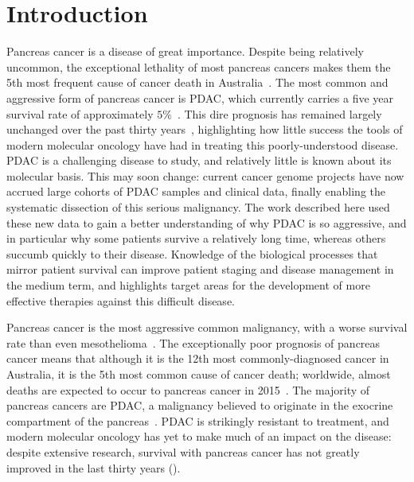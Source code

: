 \documentclass[thesis.tex]{subfiles}
\begin{document}
\chapter[Introduction]{Introduction}
\label{chap:intro}

Pancreas cancer is a disease of great importance.  Despite being relatively uncommon, the exceptional lethality of most pancreas cancers makes them the 5th most frequent cause of cancer death in Australia~\cite{CAN88}.  The most common and aggressive form of pancreas cancer is \gls{PDAC}, which currently carries a five year survival rate of approximately $5\%$~\cite{CAN65}.  This dire prognosis has remained largely unchanged over the past thirty years~\cite{CAN65, SEER2014}, highlighting how little success the tools of modern molecular oncology have had in treating this poorly-understood disease.  \gls{PDAC} is a challenging disease to study, and relatively little is known about its molecular basis.  This may soon change: current cancer genome projects have now accrued large cohorts of \gls{PDAC} samples and clinical data, finally enabling the systematic dissection of this serious malignancy.  The work described here used these new data to gain a better understanding of why \gls{PDAC} is so aggressive, and in particular why some patients survive a relatively long time, whereas others succumb quickly to their disease.  Knowledge of the biological processes that mirror patient survival can improve patient staging and disease management in the medium term, and highlights target areas for the development of more effective therapies against this difficult disease.

Pancreas cancer is the most aggressive common malignancy, with a worse survival rate than even mesothelioma~\cite{CAN65}.  The exceptionally poor prognosis of pancreas cancer means that although it is the 12th most commonly-diagnosed cancer in Australia, it is the 5th most common cause of cancer death; worldwide, almost  deaths are expected to occur to pancreas cancer in 2015~\cite{GLOBOCAN2015}.
The majority of pancreas cancers are \gls{PDAC}, a malignancy believed to originate in the exocrine compartment of the pancreas~\cite{TODO}.  \gls{PDAC} is strikingly resistant to treatment, and modern molecular oncology has yet to make much of an impact on the disease: despite extensive research, survival with pancreas cancer has not greatly improved in the last thirty years ().
\end{document}
